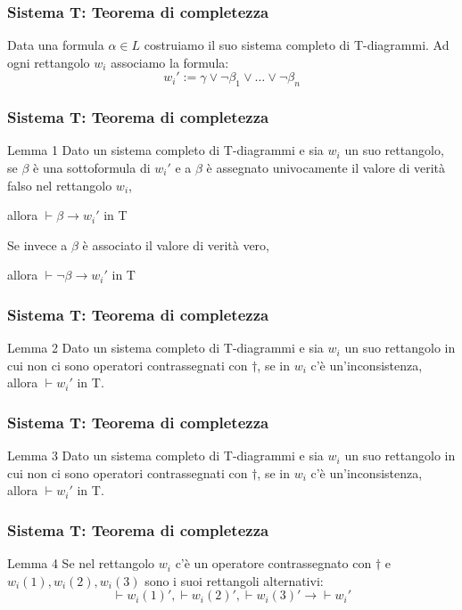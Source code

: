 \documentclass[notheorem]{beamer}
\begin{document}
\begin{frame}
\frametitle{Sistema T: Teorema di completezza}
Data una formula $\alpha \in L$ costruiamo il suo sistema completo di T-diagrammi.
Ad ogni rettangolo $w_i$ associamo la formula:
$$w_i' := \gamma \lor \neg \beta_1 \lor \ldots \lor \neg \beta_n$$
\end{frame}

\begin{frame}
\frametitle{Sistema T: Teorema di completezza}
\begin{block}{Lemma 1}
Dato un sistema completo di T-diagrammi e sia $w_i$ un suo rettangolo,
se $\beta$ è una sottoformula di $w_i'$ e a $\beta$ è assegnato univocamente il valore di verità falso
nel rettangolo $w_i$,

allora $\vdash \beta \rightarrow w_i'$ in T

Se invece a $\beta$ è associato il valore di verità vero,


allora $\vdash \neg \beta \rightarrow w_i'$ in T
\end{block}
\end{frame}

\begin{frame}
\frametitle{Sistema T: Teorema di completezza}
\begin{block}{Lemma 2}
Dato un sistema completo di T-diagrammi e sia $w_i$ un suo rettangolo in cui
non ci sono operatori contrassegnati con $\dagger$,
se in $w_i$ c'è un'inconsistenza, allora $\vdash w_i'$ in T.
\end{block}
\end{frame}

\begin{frame}
\frametitle{Sistema T: Teorema di completezza}
\begin{block}{Lemma 3}
Dato un sistema completo di T-diagrammi e sia $w_i$ un suo rettangolo in cui
non ci sono operatori contrassegnati con $\dagger$,
se in $w_i$ c'è un'inconsistenza, allora $\vdash w_i'$ in T.
\end{block}
\end{frame}

\begin{frame}
\frametitle{Sistema T: Teorema di completezza}

\begin{block}{Lemma 4}
Se nel rettangolo $w_i$ c'è un operatore contrassegnato con $\dagger$
e $w_i(1), w_i(2), w_i(3)$ sono i suoi rettangoli alternativi:
$$\vdash w_i(1)', \vdash w_i(2)', \vdash w_i(3)' \rightarrow \vdash w_i'$$
\end{block}
\end{frame}
\end{document}
